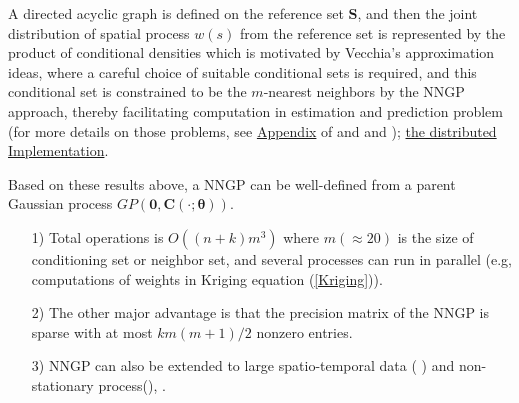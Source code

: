 \documentclass[
12pt, %
a4paper, %
oneside, %
headinclude,footinclude, %
BCOR5mm, %
]{scrartcl}
\begin{document}
A directed acyclic graph is defined on the reference set $\boldsymbol{S}$, and then the joint distribution of spatial process $w(s)$ from the reference set is represented by the product of conditional densities which is motivated by Vecchia’s approximation \citep{vecchia1988estimation} ideas, where a careful choice of suitable conditional sets is required, and this conditional set is constrained to be the $m$-nearest neighbors by the NNGP approach, thereby facilitating computation in estimation and prediction problem (for more details on those problems, see  \href{https://chenyw68.github.io/Literature/[2016]Hierarchical nearest-neighbor Gaussian process models for large geostatistical datasets-Appdix.pdf}{Appendix} of \href{https://chenyw68.github.io/Literature/[2016]Hierarchical nearest-neighbor Gaussian process models for large geostatistical datasets.pdf}{\cite{datta2016hierarchical}} and \href{https://chenyw68.github.io/Literature/[2017]Applying Nearest Neighbor Gaussian Processes to Massive Spatial Data Sets.pdf}{\citep{finley2017applying}} and \href{https://chenyw68.github.io/Literature/[2019]Efficient algorithms for bayesian nearest neighbor gaussian processes.pdf}{\cite{finley2019efficient}}); \href{https://chenyw68.github.io/Literature/[2019]Distributed Implementation of Nearest-Neighbor Gaussian process.pdf}{the distributed Implementation}.

Based on these results above, a NNGP can be well-defined from a parent Gaussian process $GP(\boldsymbol{0}, \boldsymbol{C\left(\cdot; \boldsymbol{\theta}\right)})$.


\begin{itemize}
 \item [1)] Total operations is $O((n + k)m^3)$ where $m (\approx 20)$ is the size of conditioning set or neighbor set, and several processes can run in parallel (e.g, computations of weights in Kriging equation (\ref{Kriging})).
 \item [2)] The other major advantage is that the precision matrix of the NNGP is sparse with at most $km(m + 1)/2$ nonzero entries.
 \item [3)] NNGP can also be extended to large spatio-temporal data (
\href{https://chenyw68.github.io/Literature/[2016]Nonseparable dynamic NNGP models for large spatio-temporal data.pdf}{\cite{datta2016nonseparable}}) and non-stationary process(\href{https://chenyw68.github.io/Literature/[2020]Computationally efficient nonstationary NNGP models using data-driven techniques.pdf}{\cite{konomi2019computationally}}), \href{https://chenyw68.github.io/Literature/[2020-formal]Bayesian inference for high dimensional nonstationary Gaussian processes.pdf}{\citep{risser2020bayesian}}.
\end{itemize}
\end{document}
